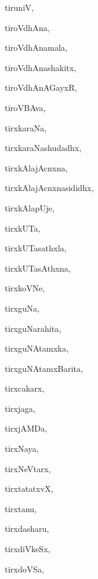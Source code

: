 \begin{multicols}{3}
{\noindent
{tiruniV{\ru}}, \pageref{tiruniVru}

\noindent
{tiroVdhAna}, \pageref{tiroVdhAna}

\noindent
{tiroVdhAnamala}, \pageref{tiroVdhAnamala}

\noindent
{tiroVdhAnashakitx}, \pageref{tiroVdhAnashakitx}

\noindent
{tiroVdhAnAGayxR}, \pageref{tiroVdhAnAGayxR}

\noindent
{tiroVBAva}, \pageref{tiroVBAva}

\noindent
{tirxkaraNa}, \pageref{tirxkaraNa}

\noindent
{tirxkaraNashudadhx}, \pageref{tirxkaraNashudadhx}

\noindent
{tirxkAlajAcnxna}, \pageref{tirxkAlajAcnxna}

\noindent
{tirxkAlajAcnxnasididhx}, \pageref{tirxkAlajAcnxnasididhx}

\noindent
{tirxkAlapUje}, \pageref{tirxkAlapUje}

\noindent
{tirxkUTa}, \pageref{tirxkUTa}

\noindent
{tirxkUTasathxla}, \pageref{tirxkUTasathxla}

\noindent
{tirxkUTasAthxna}, \pageref{tirxkUTasAthxna}

\noindent
{tirxkoVNe}, \pageref{tirxkoVNe}

\noindent
{tirxguNa}, \pageref{tirxguNa}

\noindent
{tirxguNarahita}, \pageref{tirxguNarahita}

\noindent
{tirxguNAtamxka}, \pageref{tirxguNAtamxka}

\noindent
{tirxguNAtamxBarita}, \pageref{tirxguNAtamxBarita}

\noindent
{tirxcakarx}, \pageref{tirxcakarx}

\noindent
{tirxjaga}, \pageref{tirxjaga}

\noindent
{tirxjAMDa}, \pageref{tirxjAMDa}

\noindent
{tirxNaya}, \pageref{tirxNaya}

\noindent
{tirxNeVtarx}, \pageref{tirxNeVtarx}

\noindent
{tirxtatatxvX}, \pageref{tirxtatatxvX}

\noindent
{tirxtanu}, \pageref{tirxtanu}

\noindent
{tirxdasharu}, \pageref{tirxdasharu}

\noindent
{tirxdiVkeSx}, \pageref{tirxdiVkeSx}

\noindent
{tirxdoVSa}, \pageref{tirxdoVSa}

}
\end{multicols}
